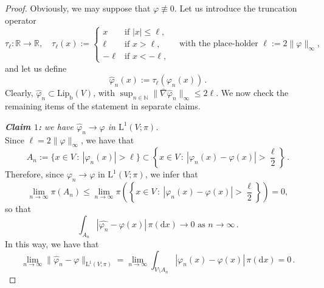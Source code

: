 \documentclass[11pt,reqno]{amsart}
\numberwithin{equation}{section}
\newcommand{\N}{\mathbb{N}}
\newcommand{\R}{\mathbb{R}}
\newcommand{\Lipb}{\mathrm{Lip}_{\mathrm{b}}}
\newcommand{\dd}{\mathrm{d}}
\theoremstyle{definition}
\def\dd{\mathrm{d}}
\newcommand{\rmL}{\mathrm{L}}
\numberwithin{equation}{section}
\begin{document}
\begin{proof}
Obviously, we may suppose that $\varphi \not\equiv 0$. 
Let us introduce the truncation operator
\[
\tau_\ell: \R \to \R, \quad 
\tau_\ell(x):= \begin{cases}
x & \text{if } |x|\leq \ell,
\\
\ell & \text{if } x >\ell,
\\
-\ell  &  \text{if } x <-\ell,
\end{cases}
\quad \text{with  the place-holder } \ell:= 2\|\varphi\|_{\infty},
\]
and let us  define 
\begin{equation}
\label{truncated-phin}
\widehat{\varphi}_n(x):= \tau_\ell(\varphi_n(x))\,.
\end{equation}
Clearly, $ \widehat{\varphi}_n \subset \Lipb(V)$, with   $ \sup_{n
\in \N} \|\overline\nabla \widehat{\varphi}_n \|_\infty
\leq 2\ell$.  We now check the remaining items of the statement in separate claims.  
\smallskip

\par
\noindent
{\sl \textbf{Claim $1$:} we have  $\widehat{\varphi}_n\to\varphi$ in $\rmL^1(V;\pi)$.}
\\
Since $\ell =2 \|\varphi\|_{\infty}$, we have that 
\[
A_n:= \{ x\in V\, : \ |\varphi_n(x) | >\ell \} \subset\left \{ x\in V\, : \ |\varphi_n(x){-} \varphi(x) | >\frac{\ell}2 \right \}\,.
\]
Therefore, since $\varphi_n \to \varphi$ in $\rmL^1(V;\pi)$, we infer that 
\[
\lim_{n\to \infty} \pi (A_n) \leq \lim_{n\to \infty} \pi \left(\left\{ x\in V\, : \ |\varphi_n(x){-} \varphi(x) | >\frac{\ell}2 \right \}\right) =0,
\]
so that 
\[
 \int_{A_n} |\widehat{\varphi_n}{-}\varphi(x)| \, \pi(\dd x) \longrightarrow  0 \text{ as } n \to \infty\,.
\]
In this way, we have that 
\[
\lim_{n\to\infty}\| \widehat{\varphi}_n{-} \varphi\|_{\rmL^1(V;\pi)} = \lim_{n\to\infty} \int_{V{\setminus}A_n} |\varphi_n(x){-}\varphi(x)| \, \pi(\dd x) =0\,.
\]
\smallskip


\end{proof}
\end{document}

